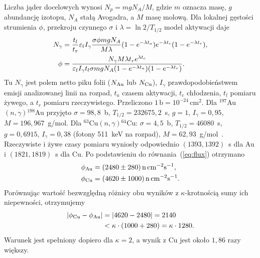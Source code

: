 \documentclass[twocolumn,a4paper,10pt]{article}
\begin{document}
Liczba jąder docelowych wynosi $N_p=mgN_A/M$,
gdzie $m$ oznacza masę, $g$ abundancję izotopu,
$N_A$ stałą Avogadra, a $M$ masę molową.
Dla lokalnej gęstości strumienia $\phi$, przekroju
czynnego $\sigma$ i $\lambda=\ln2/T_{1/2}$ model
aktywacji daje
\begin{align}
N_\gamma={}&\frac{t_l}{t_r}\varepsilon_{\rm f}I_\gamma
\frac{\sigma\phi mgN_A}{M\lambda}
(1-e^{-\lambda t_a})e^{-\lambda t_c}
(1-e^{-\lambda t_r}),\label{eq:counts}\\
\phi={}&\frac{N_\gamma M\lambda t_r e^{\lambda t_c}}
{\varepsilon_{\rm f}I_\gamma t_l\sigma mgN_A
(1-e^{-\lambda t_a})(1-e^{-\lambda t_r})}.
\label{eq:flux}
\end{align}
Tu $N_\gamma$ jest polem netto piku folii ($N_{\rm Au}$
lub $N_{\rm Cu}$), $I_\gamma$ prawdopodobieństwem emisji
analizowanej linii na rozpad, $t_a$ czasem aktywacji,
$t_c$ chłodzenia, $t_l$ pomiaru żywego, a $t_r$ pomiaru
rzeczywistego.
Przeliczono $1\,\mathrm b=10^{-24}\,\mathrm{cm^2}$.
Dla $^{197}$Au$(n,\gamma){}^{198}$Au przyjęto
$\sigma=98{,}8$~b, $T_{1/2}=232675{,}2$~s,
$g=1$, $I_\gamma=0{,}95$, $M=196{,}967$~g/mol.
Dla $^{63}$Cu$(n,\gamma){}^{64}$Cu:
$\sigma=4{,}5$~b, $T_{1/2}=46080$~s,
$g=0{,}6915$, $I_\gamma=0{,}38$ (fotony 511~keV na rozpad),
$M=62{,}93$~g/mol~\cite{dodatkowe}.
Rzeczywiste i żywe czasy pomiaru wyniosły odpowiednio
$(1393,1392)$~s dla Au i $(1821,1819)$~s dla Cu.
Po podstawieniu do równania~(\ref{eq:flux}) otrzymano
\begin{align}
\phi_{\rm Au}&=(2480\pm280)\,\mathrm{n\,cm^{-2}s^{-1}},\\
\phi_{\rm Cu}&=(4620\pm1000)\,\mathrm{n\,cm^{-2}s^{-1}}.
\label{eq:results}
\end{align}
Porównując wartość bezwzględną różnicy obu wyników
z $\kappa$-krotnością sumy ich niepewności, otrzymujemy
\begin{equation}
\begin{aligned}
\left\lvert\phi_{\rm Cu}-\phi_{\rm Au}\right\rvert
&=\lvert4620-2480\rvert=2140\\
&<\kappa\cdot(1000+280)=\kappa\cdot1280.
\end{aligned}
\label{eq:zgodnosc}
\end{equation}
Warunek jest spełniony dopiero dla $\kappa=2$,
a wynik z Cu jest około $1{,}86$ razy większy.
\end{document}
